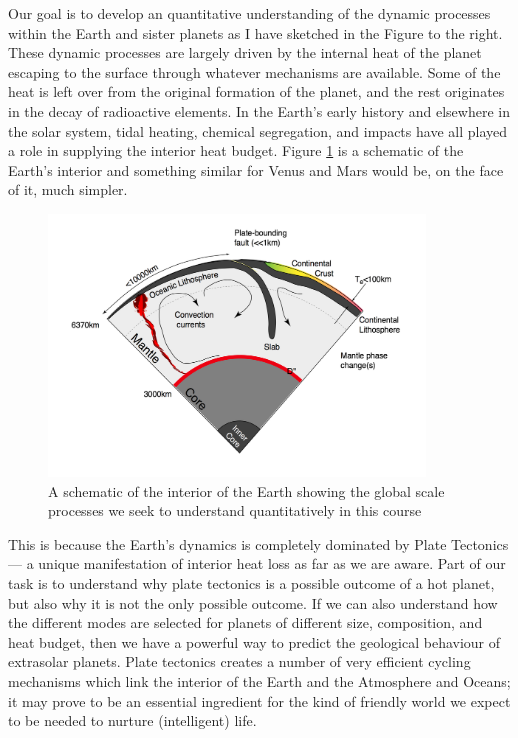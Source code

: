 \documentclass[10pt]{article}
\begin{document}
Our goal is to develop an quantitative understanding of the dynamic processes within
the Earth and sister planets as I have sketched in the Figure to the right. These dynamic
processes are largely driven by the internal heat of the planet escaping to the surface 
through whatever mechanisms are available. Some of the heat is left over from the
original formation of the planet, and the rest originates in the decay of
radioactive elements. In the Earth's early history and elsewhere in the solar system, 
tidal heating, chemical segregation, and impacts have all played a role in supplying the 
interior heat budget. Figure \ref{fig:Diagrams_EarthProcessesPlume} is a schematic of the Earth's 
interior and something similar for Venus and Mars would be, on the face of it, much simpler.

\begin{figure} 
	\begin{center}
		\includegraphics[width=100mm]{Diagrams/EarthProcessesPlume.png}
		 \caption[]{A schematic of the interior of the Earth showing the global 
		            scale processes we seek to understand quantitatively in this course}
	\end{center}
	\label{fig:Diagrams_EarthProcessesPlume}	
\end{figure}

This is because the Earth's dynamics is completely dominated by Plate Tectonics --- a unique
manifestation of interior heat loss as far as we are aware. Part of our task is to understand
why plate tectonics is a possible outcome of a hot planet, but also why it is not the only 
possible outcome. If we can also understand how the different modes are selected for planets
of different size, composition, and heat budget, then we have a powerful way to predict the
geological behaviour of extrasolar planets. Plate tectonics creates a number of very efficient
cycling mechanisms which link the interior of the Earth and the Atmosphere and Oceans; it may
prove to be an essential ingredient for the kind of friendly world we expect to be needed to 
nurture (intelligent) life. 
\end{document}
